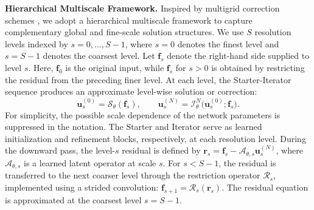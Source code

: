 \documentclass[preprint,numbers,sort&compress]{elsarticle}
\begin{document}
		
		
		
		
		
		
		
		
		\textbf{Hierarchical Multiscale Framework.}
		Inspired by multigrid correction schemes \cite{xu1992iterative}, we adopt a hierarchical multiscale framework to capture complementary global and fine-scale solution structures. We use $S$ resolution levels indexed by
		$s=0,\ldots,S-1$, where $s=0$ denotes the finest level and $s=S-1$ denotes the coarsest level. Let $\boldsymbol f_s$ denote the right-hand side supplied to level $s$. Here, $\boldsymbol f_0$ is the original input, while
		$\boldsymbol f_s$ for $s>0$ is obtained by restricting the residual from the preceding finer level. At each level, the Starter-Iterator sequence produces an approximate
		level-wise solution or correction:
		\begin{equation}
			\label{eq:dual-domain}
			\boldsymbol u_s^{(0)}
			=
			\mathcal S_\theta(\boldsymbol f_s),
			\qquad
			\boldsymbol u_s^{(N)}
			=
			\mathcal I_\theta^N
			\big(
			\boldsymbol u_s^{(0)};
			\boldsymbol f_s
			\big).
		\end{equation}
		For simplicity, the possible scale dependence of the network parameters is suppressed in the notation. The Starter and Iterator serve as learned initialization and refinement blocks, respectively, at each resolution level.  
		During the downward pass, the level-$s$ residual is defined by $\boldsymbol r_s = \boldsymbol f_s - \mathcal A_{\theta,s}\boldsymbol u_s^{(N)}$, where $\mathcal A_{\theta,s}$ is a learned latent operator
		at scale $s$. For $s<S-1$, the residual is transferred to the next coarser level through the restriction operator $\mathcal R_s$, implemented using a strided
		convolution:
		$\boldsymbol f_{s+1}=\mathcal R_s(\boldsymbol r_s)$. 
		The residual equation is approximated at the coarsest level $s=S-1$.
		
\end{document}
